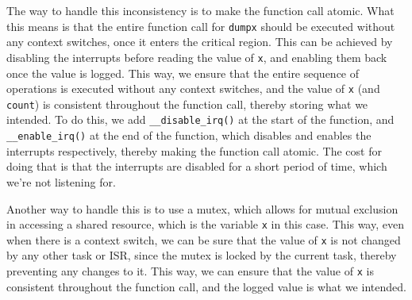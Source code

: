 \vspace*{1em}

The way to handle this inconsistency is to make the function call atomic.
What this means is that the entire function call for \texttt{dumpx} should be executed without any context switches, once it enters the critical region.
This can be achieved by disabling the interrupts before reading the value of \texttt{x}, and enabling them back once the value is logged.
This way, we ensure that the entire sequence of operations is executed without any context switches, and the value of \texttt{x} (and \texttt{count}) is consistent throughout the function call, thereby storing what we intended.
To do this, we add \texttt{\_\_disable\_irq()} at the start of the function, and \texttt{\_\_enable\_irq()} at the end of the function, which disables and enables the interrupts respectively, thereby making the function call atomic.
The cost for doing that is that the interrupts are disabled for a short period of time, which we're not listening for.

Another way to handle this is to use a mutex, which allows for mutual exclusion in accessing a shared resource, which is the variable \texttt{x} in this case.
This way, even when there is a context switch, we can be sure that the value of \texttt{x} is not changed by any other task or ISR, since the mutex is locked by the current task, thereby preventing any changes to it.
This way, we can ensure that the value of \texttt{x} is consistent throughout the function call, and the logged value is what we intended.
